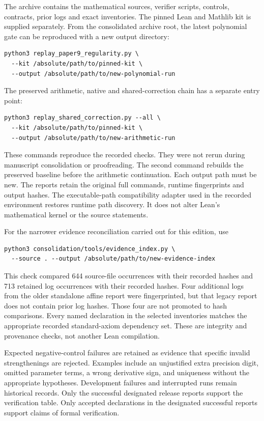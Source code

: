 The archive contains the mathematical sources, verifier scripts, controls,
contracts, prior logs and exact inventories. The pinned Lean and Mathlib kit
is supplied separately. From the consolidated archive root, the latest
polynomial gate can be reproduced with a new output directory:
\begin{verbatim}
python3 replay_paper9_regularity.py \
  --kit /absolute/path/to/pinned-kit \
  --output /absolute/path/to/new-polynomial-run
\end{verbatim}
The preserved arithmetic, native and shared-correction chain has a separate
entry point:
\begin{verbatim}
python3 replay_shared_correction.py --all \
  --kit /absolute/path/to/pinned-kit \
  --output /absolute/path/to/new-arithmetic-run
\end{verbatim}
These commands reproduce the recorded checks. They were not rerun during
manuscript consolidation or proofreading. The second command rebuilds
the preserved baseline before the arithmetic continuation. Each output path
must be new. The reports retain the original full commands, runtime
fingerprints and output hashes. The executable-path compatibility adapter
used in the recorded environment restores runtime path discovery. It does
not alter Lean's mathematical kernel or the source statements.

For the narrower evidence reconciliation carried out for this edition, use
\begin{verbatim}
python3 consolidation/tools/evidence_index.py \
  --source . --output /absolute/path/to/new-evidence-index
\end{verbatim}
This check compared 644 source-file occurrences with their recorded hashes
and 713 retained log occurrences with their recorded hashes. Four additional
logs from the older standalone affine report were fingerprinted, but that
legacy report does not contain prior log hashes. Those four are not promoted
to hash comparisons. Every named declaration in the selected inventories
matches the appropriate recorded standard-axiom dependency set. These are
integrity and provenance checks, not another Lean compilation.

Expected negative-control failures are retained as evidence that specific
invalid strengthenings are rejected. Examples include an unjustified extra
precision digit, omitted parameter terms, a wrong derivative sign, and
uniqueness without the appropriate hypotheses. Development failures and
interrupted runs remain historical records. Only the successful designated
release reports support the verification table. Only accepted declarations in the designated successful reports support
claims of formal verification.

